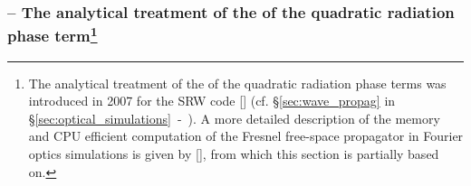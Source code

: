 \begin{refsection}
\subsubsection*{\normalsize -- The analytical treatment of the of the quadratic radiation phase term\footnote{The analytical treatment of the of the quadratic radiation phase terms was introduced in 2007 for the SRW code [\cite{Chubar2008}] (cf. §\ref{sec:wave_propag} in §\ref{sec:optical_simulations}~-~\textit{}). A more detailed description of the memory and CPU efficient computation of the Fresnel free-space propagator in Fourier optics simulations is given by [\cite{Chubar2019}], from which this section is partially based on.}}


\end{refsection}
